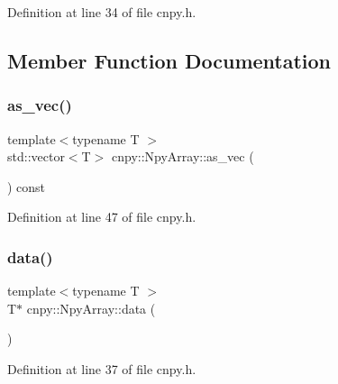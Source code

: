 Definition at line 34 of file cnpy.\+h.



\subsection{Member Function Documentation}
\mbox{\label{structcnpy_1_1_npy_array_a4cf626dc18eec8b40fabd499253a069c}} 
\subsubsection{\texorpdfstring{as\+\_\+vec()}{as\_vec()}}
{\footnotesize\ttfamily template$<$typename T $>$ \\
std\+::vector$<$T$>$ cnpy\+::\+Npy\+Array\+::as\+\_\+vec (\begin{DoxyParamCaption}{ }\end{DoxyParamCaption}) const\hspace{0.3cm}{\ttfamily [inline]}}



Definition at line 47 of file cnpy.\+h.

\mbox{\label{structcnpy_1_1_npy_array_a367b7feaf166b62930cc6ce1c4426fc4}} 
\subsubsection{\texorpdfstring{data()}{data()}\hspace{0.1cm}{\footnotesize\ttfamily [1/2]}}
{\footnotesize\ttfamily template$<$typename T $>$ \\
T$\ast$ cnpy\+::\+Npy\+Array\+::data (\begin{DoxyParamCaption}{ }\end{DoxyParamCaption})\hspace{0.3cm}{\ttfamily [inline]}}



Definition at line 37 of file cnpy.\+h.

